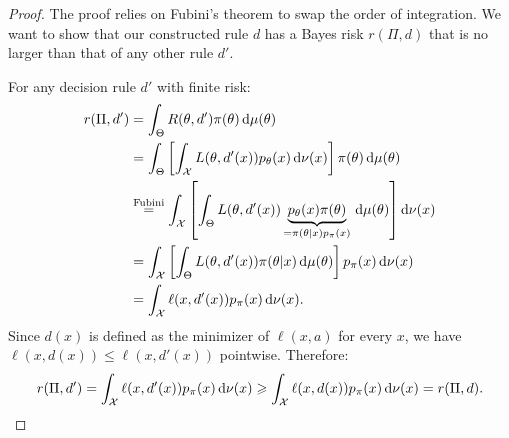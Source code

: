 \begin{proof}
    The proof relies on Fubini's theorem to swap the order of integration. We want to show that our constructed rule \(d\) has a Bayes risk \(r(\Pi, d)\) that is no larger than that of any other rule \(d'\).
    
    For any decision rule \(d'\) with finite risk:
    \[
    \begin{split} 
    r(\Pi, d') &= \int_{\Theta} R(\theta, d') \pi(\theta) \, \mathrm{d}\mu(\theta) \\ 
    &= \int_{\Theta} \left[ \int_{\mathcal{X}} L(\theta, d'(x)) p_{\theta}(x) \, \mathrm{d}\nu(x) \right] \pi(\theta) \, \mathrm{d}\mu(\theta) \\ 
    &\stackrel{\text{Fubini}}{=} \int_{\mathcal{X}} \left[ \int_{\Theta} L(\theta, d'(x)) \underbrace{p_{\theta}(x) \pi(\theta)}_{=\pi(\theta|x) p_{\pi}(x)} \, \mathrm{d}\mu(\theta) \right] \mathrm{d}\nu(x) \\ 
    &= \int_{\mathcal{X}} \left[ \int_{\Theta} L(\theta, d'(x)) \pi(\theta|x) \, \mathrm{d}\mu(\theta) \right] p_{\pi}(x) \, \mathrm{d}\nu(x) \\ 
    &= \int_{\mathcal{X}} \ell(x, d'(x)) p_{\pi}(x) \, \mathrm{d}\nu(x).
    \end{split}
    \]
    Since \(d(x)\) is defined as the minimizer of \(\ell(x, a)\) for every \(x\), we have \(\ell(x, d(x)) \le \ell(x, d'(x))\) pointwise. Therefore:
    \[
    r(\Pi,d')=\int_{\mathcal{X}} \ell(x, d'(x)) p_{\pi}(x) \, \mathrm{d}\nu(x) \geqslant \int_{\mathcal{X}} \ell(x, d(x)) p_{\pi}(x) \, \mathrm{d}\nu(x) = r(\Pi, d).
    \]
\end{proof}



